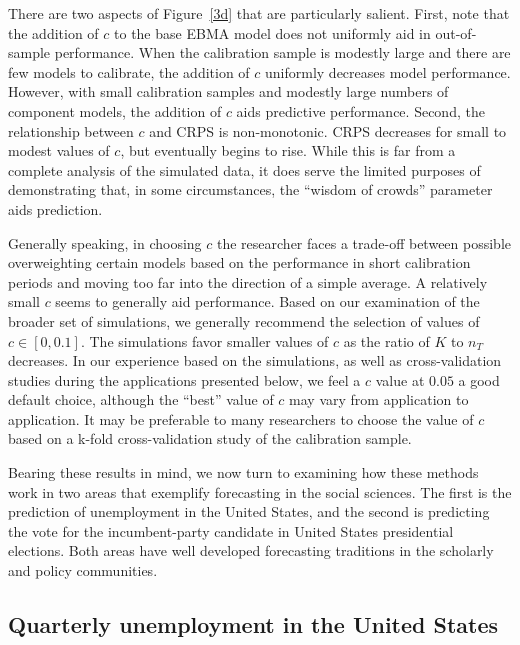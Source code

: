 \documentclass[12pt,fullpage,endnotes]{article}
\begin{document}
There are two aspects of Figure~\ref{3d} that are particularly
salient.  First, note that the addition of $c$ to the base EBMA model
does not uniformly aid in out-of-sample performance.  When the
calibration sample is modestly large and there are few models to
calibrate, the addition of $c$ uniformly decreases model performance.
However, with small calibration samples and modestly large numbers of
component models, the addition of $c$ aids predictive
performance. Second, the relationship between $c$ and CRPS is
non-monotonic.  CRPS decreases for small to modest values of $c$, but
eventually begins to rise.  While this is far from a complete analysis
of the simulated data, it does serve the limited purposes of
demonstrating that, in some circumstances, the ``wisdom of crowds''
parameter aids prediction.

Generally speaking, in choosing $c$ the researcher faces a trade-off
between possible overweighting certain models based on the performance
in short calibration periods and moving too far into the direction of
a simple average. A relatively small $c$ seems to generally aid
performance.  Based on our examination of the broader set of
simulations, we generally recommend the selection of values of $c \in
[0, 0.1]$. The simulations favor smaller values of $c$ as the ratio of
$K$ to $n_T$ decreases.  In our experience based on the simulations,
as well as cross-validation studies during the applications presented
below, we feel a $c$ value at $0.05$ a good default choice, although
the ``best'' value of $c$ may vary from application to application.
It may be preferable to many researchers to choose the value of $c$
based on a k-fold cross-validation study of the calibration sample.

Bearing these results in mind, we now turn to examining how these
methods work in two areas that exemplify forecasting in the social
sciences. The first is the prediction of unemployment in the United
States, and the second is predicting the vote for the incumbent-party
candidate in United States presidential elections. Both areas have well
developed forecasting traditions in the scholarly and policy
communities.


\subsection{Quarterly unemployment in the United States}
\label{econ}
\end{document}
